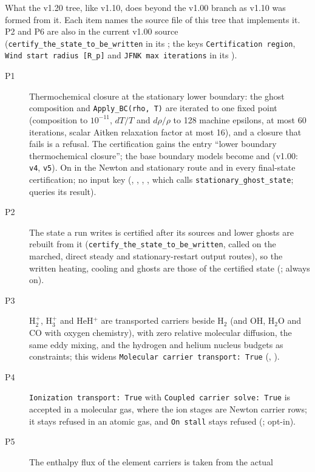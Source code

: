 \documentclass[english,a4paper]{my_memo}
\begin{document}
What the v1.20 tree, like v1.10, does beyond the v1.00 branch as v1.10 was
formed from it. Each item names the source file of this tree that
implements it. P2 and P6 are also in the current v1.00 source
(\texttt{certify\_the\_state\_to\_be\_written} in its
; the keys \texttt{Certification region},
\texttt{Wind start radius [R\_p]} and \texttt{JFNK max iterations} in its
).
\begin{description}
\item[P1] Thermochemical closure at the stationary lower boundary: the ghost
  composition and \texttt{Apply\_BC(rho, T)} are iterated to one fixed point
  (composition to $10^{-11}$, $dT/T$ and $d\rho/\rho$ to 128 machine
  epsilons, at most 60 iterations, scalar Aitken relaxation factor at most
  16), and a closure that fails is a refusal. The certification gains the
  entry ``lower boundary thermochemical closure''; the base boundary models
  become  and
   (v1.00: \texttt{v4},
  \texttt{v5}). On in the Newton and stationary route and in every
  final-state certification; no input key
  (,
  , ,
  , which calls
  \texttt{stationary\_ghost\_state};  queries its
  result).
\item[P2] The state a run writes is certified after its sources and lower
  ghosts are rebuilt from it (\texttt{certify\_the\_state\_to\_be\_written},
  called on the marched, direct steady and stationary-restart output routes),
  so the written heating, cooling and ghosts are those of the certified state
  (; always on).
\item[P3] H$_2^+$, H$_3^+$ and HeH$^+$ are transported carriers beside H$_2$
  (and OH, H$_2$O and CO with oxygen chemistry), with zero relative molecular
  diffusion, the same eddy mixing, and the hydrogen and helium nucleus budgets
  as constraints; this widens \texttt{Molecular carrier transport: True}
  (, ).
\item[P4] \texttt{Ionization transport: True} with \texttt{Coupled carrier
  solve: True} is accepted in a molecular gas, where the ion stages are Newton
  carrier rows; it stays refused in an atomic gas, and \texttt{On stall}
  stays refused (; opt-in).
\item[P5] The enthalpy flux of the element carriers is taken from the actual

\end{description}
\end{document}
